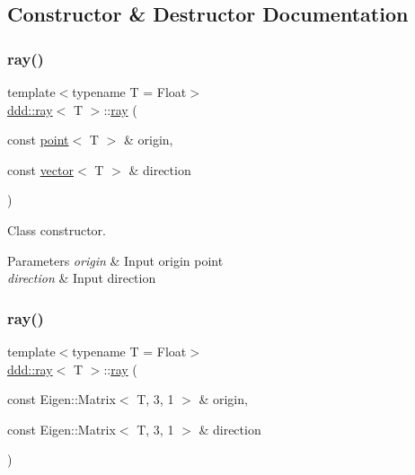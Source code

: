 \subsection{Constructor \& Destructor Documentation}
\mbox{\label{classddd_1_1ray_acac10719a90ebaa930a55f2aff5dd372}} 
\subsubsection{\texorpdfstring{ray()}{ray()}\hspace{0.1cm}{\footnotesize\ttfamily [1/2]}}
{\footnotesize\ttfamily template$<$typename T = Float$>$ \\
\hyperlink{classddd_1_1ray}{ddd\+::ray}$<$ T $>$\+::\hyperlink{classddd_1_1ray}{ray} (\begin{DoxyParamCaption}\item[{const \hyperlink{classddd_1_1point}{point}$<$ T $>$ \&}]{origin,  }\item[{const \hyperlink{classddd_1_1vector}{vector}$<$ T $>$ \&}]{direction }\end{DoxyParamCaption})\hspace{0.3cm}{\ttfamily [inline]}}



Class constructor. 


\begin{DoxyParams}{Parameters}
{\em origin} & Input origin point \\
\hline
{\em direction} & Input direction \\
\hline
\end{DoxyParams}
\mbox{\label{classddd_1_1ray_a7dda924f93114bf913684c0241637f7d}} 
\subsubsection{\texorpdfstring{ray()}{ray()}\hspace{0.1cm}{\footnotesize\ttfamily [2/2]}}
{\footnotesize\ttfamily template$<$typename T = Float$>$ \\
\hyperlink{classddd_1_1ray}{ddd\+::ray}$<$ T $>$\+::\hyperlink{classddd_1_1ray}{ray} (\begin{DoxyParamCaption}\item[{const Eigen\+::\+Matrix$<$ T, 3, 1 $>$ \&}]{origin,  }\item[{const Eigen\+::\+Matrix$<$ T, 3, 1 $>$ \&}]{direction }\end{DoxyParamCaption})\hspace{0.3cm}{\ttfamily [inline]}}



